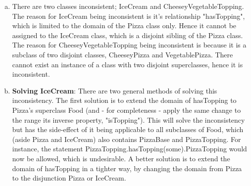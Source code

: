 \documentclass[12pt]{article}
\begin{document}
\begin{enumerate}[a)]
\item There are two classes inconsistent; IceCream and CheeseyVegetableTopping. The reason for IceCream being inconsistent is it's relationship "hasTopping", which is limited to the domain of the Pizza class only. Hence it cannot be assigned to the IceCream class, which is a disjoint sibling of the Pizza class. \\
The reason for CheeseyVegetableTopping being inconsistent is because it is a subclass of two disjoint classes, CheeseyPizza and VegetablePizza. There cannot exist an instance of a class with two disjoint superclasses, hence it is inconsistent.
\item \textbf{Solving IceCream}: There are two general methods of solving this inconsistency. The first solution is to extend the domain of hasTopping to Pizza's superclass Food (and - for completeness - apply the same change to the range its inverse property, "isTopping"). This will solve the inconsistency but has the side-effect of it being applicable to all subclasses of Food, which (aside Pizza and IceCream) also contains PizzaBase and PizzaTopping. For instance, the statement PizzaTopping.hasTopping(some).PizzaTopping would now be allowed, which is undesirable. A better solution is to extend the domain of hasTopping in a tighter way, by changing the domain from Pizza to the disjunction Pizza or IceCream. \\


\end{enumerate}
\end{document}
